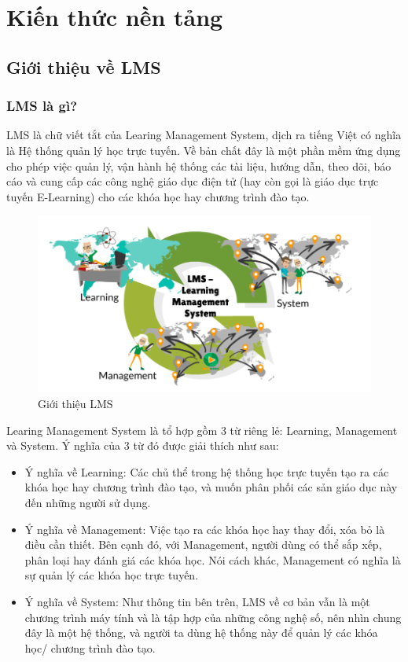 \setcounter{chapter}{1}
\fontsize{13}{5}\selectfont
\chapter{Kiến thức nền tảng}
\section{Giới thiệu về LMS }
\subsection{LMS là gì?}
LMS \cite{lms} là chữ viết tắt của Learing Management System, dịch ra tiếng Việt có nghĩa là Hệ thống quản lý học trực tuyến. Về bản chất đây là một phần mềm ứng dụng cho phép việc quản lý, vận hành hệ thống các tài liệu, hướng dẫn, theo dõi, báo cáo và cung cấp các công nghệ giáo dục điện tử (hay còn gọi là giáo dục trực tuyến E-Learning) cho các khóa học hay chương trình đào tạo.
\begin{center}
	\begin{figure}[htp]
		\begin{center}
			\includegraphics[scale=.5]{img/LMS}
		\end{center}
		\caption{Giới thiệu LMS}
		\label{refhinh1}
	\end{figure}
\end{center}
Learing Management System là tổ hợp gồm 3 từ riêng lẻ: Learning, Management và System. Ý nghĩa của 3 từ đó được giải thích như sau:
\begin{itemize}
	\item Ý nghĩa về Learning: Các chủ thể trong hệ thống học trực tuyến tạo ra các khóa học hay chương trình đào tạo, và muốn phân phối các sản giáo dục này đến những người sử dụng.
	\item Ý nghĩa về Management: Việc tạo ra các khóa học hay thay đổi, xóa bỏ là điều cần thiết. Bên cạnh đó, với Management, người dùng có thể sắp xếp, phân loại hay đánh giá các khóa học. Nói cách khác, Management có nghĩa là sự quản lý các khóa học trực tuyến.
	\item Ý nghĩa về System: Như thông tin bên trên, LMS về cơ bản vẫn là một chương trình máy tính và là tập hợp của những công nghệ số, nên nhìn chung đây là một hệ thống, và người ta dùng hệ thống này để quản lý các khóa học/ chương trình đào tạo.
\end{itemize}
